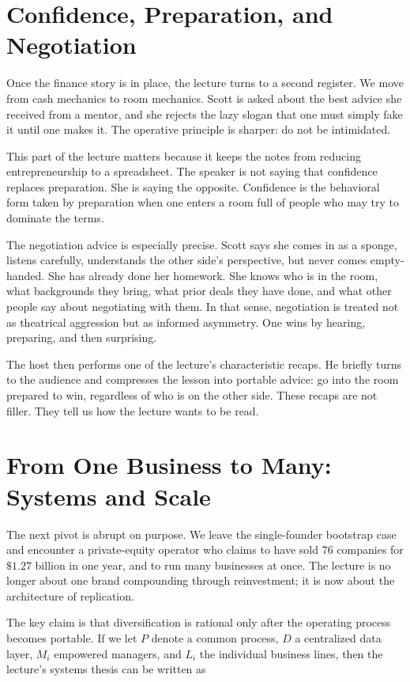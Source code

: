 \section{Confidence, Preparation, and Negotiation}

Once the finance story is in place, the lecture turns to a second register. We move from cash mechanics to room mechanics. Scott is asked about the best advice she received from a mentor, and she rejects the lazy slogan that one must simply fake it until one makes it. The operative principle is sharper: do not be intimidated.

This part of the lecture matters because it keeps the notes from reducing entrepreneurship to a spreadsheet. The speaker is not saying that confidence replaces preparation. She is saying the opposite. Confidence is the behavioral form taken by preparation when one enters a room full of people who may try to dominate the terms.

The negotiation advice is especially precise. Scott says she comes in as a sponge, listens carefully, understands the other side's perspective, but never comes empty-handed. She has already done her homework. She knows who is in the room, what backgrounds they bring, what prior deals they have done, and what other people say about negotiating with them. In that sense, negotiation is treated not as theatrical aggression but as informed asymmetry. One wins by hearing, preparing, and then surprising.

The host then performs one of the lecture's characteristic recaps. He briefly turns to the audience and compresses the lesson into portable advice: go into the room prepared to win, regardless of who is on the other side. These recaps are not filler. They tell us how the lecture wants to be read.

\section{From One Business to Many: Systems and Scale}

The next pivot is abrupt on purpose. We leave the single-founder bootstrap case and encounter a private-equity operator who claims to have sold \(76\) companies for \(\$1.27\) billion in one year, and to run many businesses at once. The lecture is no longer about one brand compounding through reinvestment; it is now about the architecture of replication.

The key claim is that diversification is rational only after the operating process becomes portable. If we let \(P\) denote a common process, \(D\) a centralized data layer, \(M_i\) empowered managers, and \(L_i\) the individual business lines, then the lecture's systems thesis can be written as

